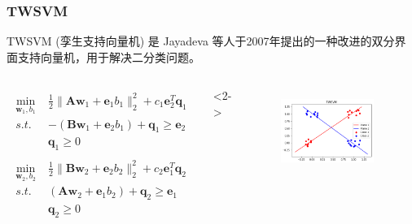 \documentclass{beamer}
\begin{document}
\begin{frame}
\frametitle{TWSVM}
TWSVM (孪生支持向量机) 是 Jayadeva 等人于2007年提出的一种改进的双分界面支持向量机，用于解决二分类问题。
\begin{columns}
\small{
\begin{align}
\begin{split}
\label{ts1}
\min_{\mathbf{w}_1,b_1} \; & \frac{1}{2}\|\mathbf{Aw}_1+\mathbf{e}_1b_1\|_2^2+c_1\mathbf{e}_2^T\mathbf{q}_1 \\
s.t.\; & -(\mathbf{Bw}_1+\mathbf{e}_2b_1)+\mathbf{q}_1 \geq \mathbf{e}_2 \\
&\mathbf{q}_1\geq 0
\end{split}
\\
\begin{split}
\label{ts2}
\min_{\mathbf{w}_2,b_2} \; & \frac{1}{2}\|\mathbf{Bw}_2+\mathbf{e}_2b_2\|_2^2+c_2\mathbf{e}_1^T\mathbf{q}_2 \\
s.t. \; & (\mathbf{Aw}_2+\mathbf{e}_1b_2)+\mathbf{q}_2\geq \mathbf{e}_1 \\
&\mathbf{q}_2\geq 0
\end{split}
\end{align}
}

<2->
\begin{figure}[ht]
\centering
\includegraphics[width=0.9\textwidth]{../img/TWSVM-img.png}
\label{twsvm1}
\end{figure}
\end{columns}
\end{frame}

\end{document}
